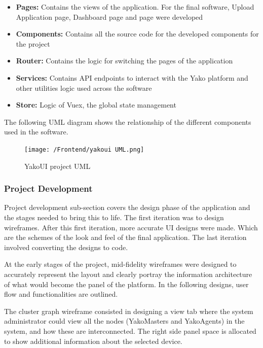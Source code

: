         \begin{itemize}
            \item \textbf{Pages:} Contains the views of the application. For the final software, Upload Application page, Dashboard page and page were developed
            \item \textbf{Components:} Contains all the source code for the developed components for the project
            \item \textbf{Router:} Contains the logic for switching the pages of the application
            \item \textbf{Services:} Contains API endpoints to interact with the Yako platform and other utilities logic used across the software
            \item \textbf{Store:} Logic of Vuex, the global state management
        \end{itemize}

        The following UML diagram shows the relationship of the different components used in the software.
        
        \begin{figure}[H]
            \centering
            \texttt{[image: /Frontend/yakoui UML.png]}
            \caption{YakoUI project UML}
            \label{fig:yakoui_uml}
        \end{figure}
        
        
    \subsubsection{Project Development}
        Project development sub-section covers the design phase of the application and the stages needed to bring this to life. The first iteration was to design wireframes. After this first iteration, more accurate UI designs were made. Which are the schemes of the look and feel of the final application. The last iteration involved converting the designs to code.
        
            At the early stages of the project, mid-fidelity wireframes were designed to accurately represent the layout and clearly portray the information architecture of what would become the panel of the platform.
            In the following designs, user flow and functionalities are outlined.
    
                The cluster graph wireframe consisted in designing a view tab where the system administrator could view all the nodes (YakoMasters and YakoAgents) in the system, and how these are interconnected. The right side panel space is allocated to show additional information about the selected device.
                
